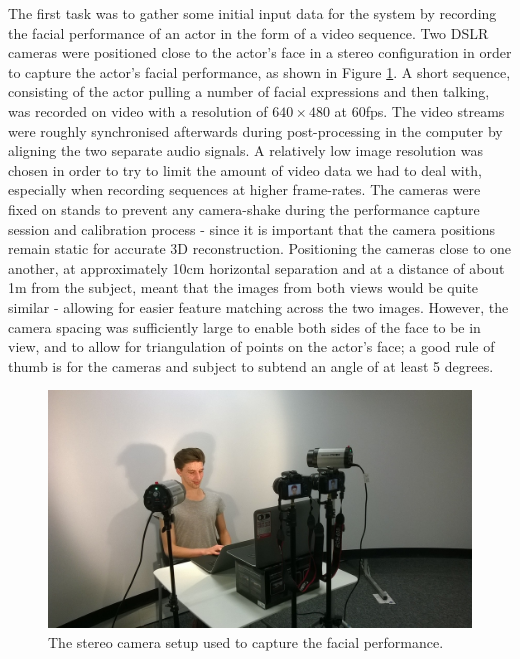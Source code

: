 The first task was to gather some initial input data for the system by recording the facial performance of an actor in the form of a video sequence. Two DSLR cameras were positioned close to the actor's face in a stereo configuration in order to capture the actor's facial performance, as shown in Figure \ref{fig:setup1}. A short sequence, consisting of the actor pulling a number of facial expressions and then talking, was recorded on video with a resolution of $640 \times 480$ at 60fps. The video streams were roughly synchronised afterwards during post-processing in the computer by aligning the two separate audio signals. A relatively low image resolution was chosen in order to try to limit the amount of video data we had to deal with, especially when recording sequences at higher frame-rates. The cameras were fixed on stands to prevent any camera-shake during the performance capture session and calibration process - since it is important that the camera positions remain static for accurate 3D reconstruction. Positioning the cameras close to one another, at approximately 10cm horizontal separation and at a distance of about 1m from the subject, meant that the images from both views would be quite similar - allowing for easier feature matching across the two images. However, the camera spacing was sufficiently large to enable both sides of the face to be in view, and to allow for triangulation of points on the actor's face; a good rule of thumb is for the cameras and subject to subtend an angle of at least 5 degrees.

\begin{figure}[htbp!]
\centering
\includegraphics[width=\textwidth]{img/setup1}
	\caption{The stereo camera setup used to capture the facial performance.}
	\label{fig:setup1}
\end{figure}

